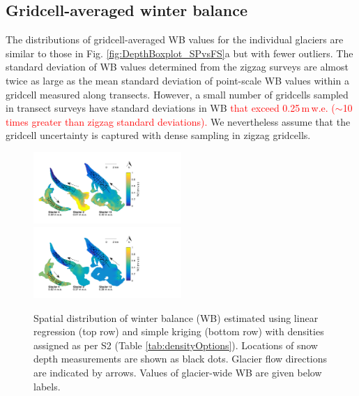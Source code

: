\documentclass[twocolumn, letterpaper]{igs}
\begin{document}
\subsection{Gridcell-averaged winter balance}

The distributions of gridcell-averaged WB values for the individual glaciers are similar to those in Fig. \ref{fig:DepthBoxplot_SPvsFS}a but with fewer outliers. The standard deviation of WB values determined from the zigzag surveys are almost twice as large as the mean standard deviation of point-scale WB values within a gridcell measured along transects. However, a small number of gridcells sampled in transect surveys have standard deviations in WB \textcolor{red}{that exceed 0.25\,m\,w.e. ($\sim$10 times greater than zigzag standard deviations).} We nevertheless assume that the gridcell uncertainty is captured with dense sampling in zigzag gridcells. 

\begin{figure}
	\centering
	\includegraphics[width =0.5\textwidth]{LR_map.pdf}\\
    \includegraphics[width =0.5\textwidth]{SK_map.pdf}\\
	\caption{Spatial distribution of winter balance (WB) estimated using linear regression (top row) and simple kriging (bottom row) with densities assigned as per S2 (Table \ref{tab:densityOptions}). Locations of snow depth measurements are shown as black dots. Glacier flow directions are indicated by arrows. Values of glacier-wide WB are given below labels.}
	\label{fig:LR_SK_map}
\end{figure}
\end{document}
